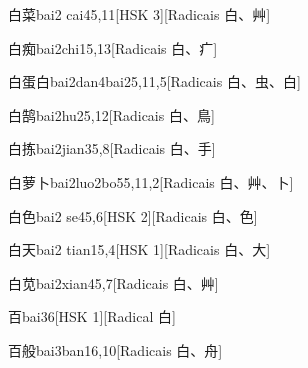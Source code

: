 \begin{entry}{白菜}{bai2 cai4}{5,11}[HSK 3][Radicais ⽩、⾋]
\end{entry}

\begin{entry}{白痴}{bai2chi1}{5,13}[Radicais ⽩、⽧]
\end{entry}

\begin{entry}{白蛋白}{bai2dan4bai2}{5,11,5}[Radicais ⽩、⾍、⽩]
\end{entry}

\begin{entry}{白鹄}{bai2hu2}{5,12}[Radicais ⽩、⿃]
\end{entry}

\begin{entry}{白拣}{bai2jian3}{5,8}[Radicais ⽩、⼿]
\end{entry}

\begin{entry}{白萝卜}{bai2luo2bo5}{5,11,2}[Radicais ⽩、⾋、⼘]
\end{entry}

\begin{entry}{白色}{bai2 se4}{5,6}[HSK 2][Radicais ⽩、⾊]
\end{entry}

\begin{entry}{白天}{bai2 tian1}{5,4}[HSK 1][Radicais ⽩、⼤]
\end{entry}

\begin{entry}{白苋}{bai2xian4}{5,7}[Radicais ⽩、⾋]
\end{entry}

\begin{entry}{百}{bai3}{6}[HSK 1][Radical ⽩]
\end{entry}

\begin{entry}{百般}{bai3ban1}{6,10}[Radicais ⽩、⾈]
\end{entry}

